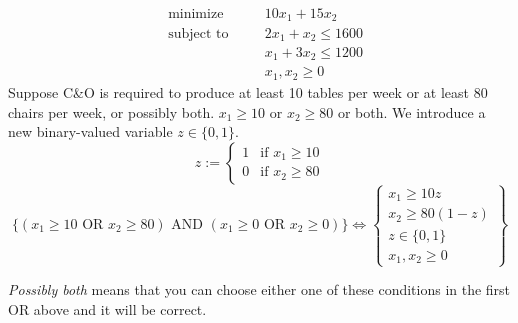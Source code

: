 \begin{exbox}
    \begin{example}
        \begin{equation}
            \begin{aligned}
                 & \text{minimize}   & \quad & 10x_1 + 15x_2             \\
                 & \text{subject to} &       & 2x_1 + x_2 \leqslant 1600 \\
                 &                   &       & x_1 + 3x_2 \leqslant 1200 \\
                 &                   &       & x_1, x_2 \geqslant  0
            \end{aligned}\tag{LP}
        \end{equation}
        Suppose C\&O is required to produce at least 10 tables per week or at least 80
        chairs per week, or possibly both. $x_1\geqslant  10$ or $x_2\geqslant  80$ or both. We
        introduce a new binary-valued variable $z\in\{0,1\}$.
        \[
            z:=
            \begin{cases}
                1 & \text{if } x_1\geqslant  10 \\
                0 & \text{if } x_2\geqslant  80
            \end{cases}
        \]
        \[
            \{(x_1\geqslant  10 \text{ OR } x_2\geqslant  80) \text{ AND }
            (x_1\geqslant  0 \text{ OR } x_2\geqslant  0)\}
            \iff
            \left\{\begin{array}{r}
                x_1\geqslant  10z     \\
                x_2\geqslant  80(1-z) \\
                z\in\{0,1\}           \\
                x_1,x_2\geqslant  0
            \end{array}\right\}
        \]
    \end{example}
\end{exbox}

\begin{remark}
    \emph{Possibly both} means that you can choose either one of these
    conditions in the first OR above and it will be correct.
\end{remark}

